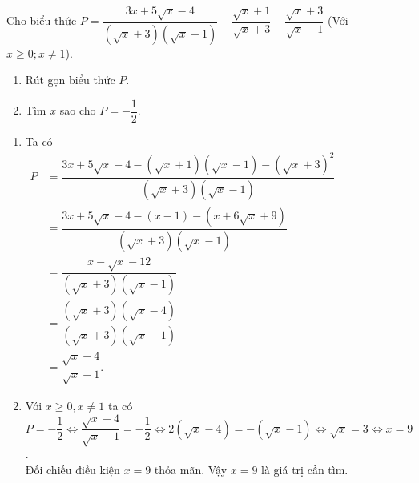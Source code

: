 \begin{ex}%
Cho biểu thức $P=\dfrac{3x+5\sqrt{x}-4}{(\sqrt{x}+3)(\sqrt{x}-1)}-\dfrac{\sqrt{x}+1}{\sqrt{x}+3}-\dfrac{\sqrt{x}+3}{\sqrt{x}-1}$ (Với $x\ge 0; x\ne 1$).
    \begin{enumerate}    
        \item Rút gọn biểu thức $P$.
        \item Tìm $x$ sao cho $P=-\dfrac{1}{2}$.
    \end{enumerate}
\loigiai
    {
    \begin{enumerate}
        \item Ta có \\
        $
        \begin{aligned}
        P&=\dfrac{3x+5\sqrt{x}-4-\left(\sqrt{x}+1\right)\left(\sqrt{x}-1\right)-\left(\sqrt{x}+3\right)^2}{\left(\sqrt{x}+3\right)\left(\sqrt{x}-1\right)}\\
        &=\dfrac{3x+5\sqrt{x}-4-\left(x-1\right)-\left(x+6\sqrt{x}+9\right)}{\left(\sqrt{x}+3\right)\left(\sqrt{x}-1\right)}\\
        &=\dfrac{x-\sqrt{x}-12}{\left(\sqrt{x}+3\right)\left(\sqrt{x}-1\right)}\\
        &=\dfrac{\left(\sqrt{x}+3\right)\left(\sqrt{x}-4\right)}{\left(\sqrt{x}+3\right)\left(\sqrt{x}-1\right)}\\
        &=\dfrac{\sqrt{x}-4}{\sqrt{x}-1}.
        \end{aligned}
        $
        \item Với $x\ge 0, x\ne 1$ ta có\\
        $P=-\dfrac{1}{2}\Leftrightarrow \dfrac{\sqrt{x}-4}{\sqrt{x}-1}=-\dfrac{1}{2}\Leftrightarrow 2(\sqrt{x}-4)=-(\sqrt{x}-1)\Leftrightarrow \sqrt{x}=3\Leftrightarrow x=9$.\\
        Đối chiếu điều kiện $x=9$ thỏa mãn. Vậy $x=9$ là giá trị cần tìm.
    \end{enumerate}
    }
\end{ex}

